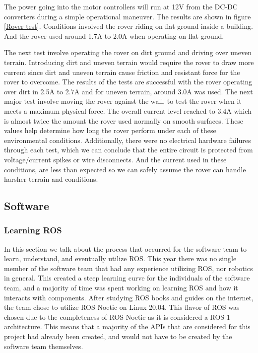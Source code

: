 \documentclass[a4paper, 10pt]{article}
\begin{document}
	The power going into the motor controllers will run at 12V from the DC-DC converters during a simple operational maneuver. The results are shown in figure \ref{Rover test}. Conditions involved the rover riding on flat ground inside a building. And the rover used around 1.7A to 2.0A when operating on flat ground. 
	
	The next test involve operating the rover on dirt ground and driving over uneven terrain. Introducing dirt and uneven terrain would require the rover to draw more current since dirt and uneven terrain cause friction and resistant force for the rover to overcome. The results of the tests are successful with the rover operating over dirt in 2.5A to 2.7A and for uneven terrain, around 3.0A was used. The next major test involve moving the rover against the wall, to test the rover when it meets a maximum physical force. The overall current level reached to 3.4A which is almost twice the amount the rover used normally on smooth surfaces. These values help determine how long the rover perform under each of these environmental conditions. Additionally, there were no electrical hardware failures through each test, which we can conclude that the entire circuit is protected from voltage/current spikes or wire disconnects. And the current used in these conditions, are less than expected so we can safely assume the rover can handle harsher terrain and conditions.

    \subsection{Software}
    \subsubsection*{Learning ROS}
    In this section we talk about the process that occurred for the software team to learn, understand, and eventually utilize ROS. This year there was no single member of the software team that had any experience utilizing ROS, nor robotics in general. This created a steep learning curve for the individuals of the software team, and a majority of time was spent working on learning ROS and how it interacts with components. After studying ROS books and guides on the internet, the team chose to utilize ROS Noetic on Linux 20.04. This flavor of ROS was chosen due to the completeness of ROS Noetic as it is considered a ROS 1 architecture. This means that a majority of the APIs that are considered for this project had already been created, and would not have to be created by the software team themselves. 
\end{document}
